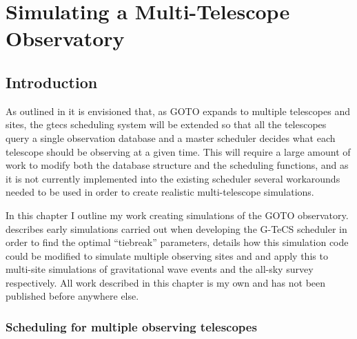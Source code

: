 \chapter{Simulating a Multi-Telescope Observatory}
\label{chap:multiscope}
\chaptoc{}


\newpage
\section{Introduction}
\label{sec:multiscope_intro}
\begin{colsection}


\begin{colsection}


As outlined in  it is envisioned that, as GOTO expands to multiple telescopes and sites, the \gls{gtecs} scheduling system will be extended so that all the telescopes query a single observation database and a master scheduler decides what each telescope should be observing at a given time. This will require a large amount of work to modify both the database structure and the scheduling functions, and as it is not currently implemented into the existing scheduler several workarounds needed to be used in order to create realistic multi-telescope simulations.

In this chapter I outline my work creating simulations of the GOTO observatory.  describes early simulations carried out when developing the G-TeCS scheduler in order to find the optimal ``tiebreak'' parameters,  details how this simulation code could be modified to simulate multiple observing sites and  and  apply this to multi-site simulations of gravitational wave events and the all-sky survey respectively. All work described in this chapter is my own and has not been published before anywhere else.

\end{colsection}


\subsection{Scheduling for multiple observing telescopes}
\label{sec:multi_tel_scheduling}
\begin{colsection}


\end{colsection}
\end{colsection}
